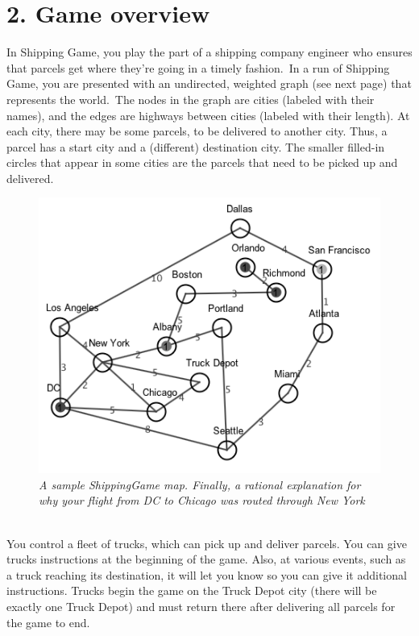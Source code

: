\documentclass[11pt]{article}
\begin{document}
\section{2. Game overview}
In Shipping Game, you play the part of a shipping company engineer who ensures that parcels get where they're going in a timely fashion.\ In a run of Shipping Game, you are presented with an undirected, weighted graph (see next page) that represents the world.\ The nodes in the graph are cities (labeled with their names), and the edges are highways between cities (labeled with their length). At each city, there may be some parcels, to be delivered to another city. Thus, a parcel has a start city and a (different) destination city.
The smaller filled-in circles that appear in some cities are the parcels that need to be picked up and delivered.\\
\begin{figure}[h]
\centerline{\includegraphics[scale=0.75]{map1.png}} 
\caption{\em{A sample ShippingGame map. Finally, a rational explanation for why your flight from DC to Chicago was routed through New York}}
\end{figure}\\
You control a fleet of trucks, which can pick up and deliver parcels. You can give trucks instructions at the beginning of the game.
Also, at various events, such as a truck reaching its destination, it will let you know so you can give it additional instructions.
Trucks begin the game on the Truck Depot city (there will be exactly one Truck Depot) and must return there after delivering all parcels for the game to end.
\end{document}
